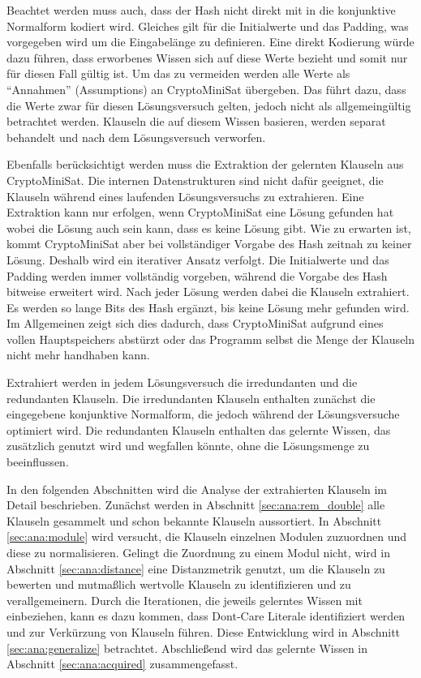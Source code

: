 Beachtet werden muss auch, dass der Hash nicht direkt mit in die konjunktive Normalform kodiert wird. Gleiches gilt für die Initialwerte
und das Padding, was vorgegeben wird um die Eingabelänge zu definieren. Eine direkt Kodierung würde dazu führen, dass erworbenes Wissen
sich auf diese Werte bezieht und somit nur für diesen Fall gültig ist. Um das zu vermeiden werden alle Werte als "`Annahmen"' (Assumptions)
an CryptoMiniSat übergeben. Das führt dazu, dass die Werte zwar für diesen Lösungsversuch gelten, jedoch nicht als allgemeingültig betrachtet
werden. Klauseln die auf diesem Wissen basieren, werden separat behandelt und nach dem Lösungsversuch verworfen.

Ebenfalls berücksichtigt werden muss die Extraktion der gelernten Klauseln aus CryptoMiniSat. Die internen Datenstrukturen sind nicht dafür
geeignet, die Klauseln während eines laufenden Lösungsversuchs zu extrahieren. Eine Extraktion kann nur erfolgen, wenn CryptoMiniSat eine
Lösung gefunden hat wobei die Lösung auch sein kann, dass es keine Lösung gibt. Wie zu erwarten ist, kommt CryptoMiniSat aber bei vollständiger
Vorgabe des Hash zeitnah zu keiner Lösung. Deshalb wird ein iterativer Ansatz verfolgt. Die Initialwerte und das Padding werden immer vollständig vorgeben,
während die Vorgabe des Hash bitweise erweitert wird. Nach jeder Lösung werden dabei die Klauseln extrahiert. Es werden so lange Bits des Hash
ergänzt, bis keine Lösung mehr gefunden wird. Im Allgemeinen zeigt sich dies dadurch, dass CryptoMiniSat aufgrund eines vollen Hauptspeichers
abstürzt oder das Programm selbst die Menge der Klauseln nicht mehr handhaben kann.

Extrahiert werden in jedem Lösungsversuch die irredundanten und die redundanten Klauseln. Die irredundanten Klauseln enthalten zunächst die
eingegebene konjunktive Normalform, die jedoch während der Lösungsversuche optimiert wird. Die redundanten Klauseln enthalten das gelernte
Wissen, das zusätzlich genutzt wird und wegfallen könnte, ohne die Lösungsmenge zu beeinflussen.

In den folgenden Abschnitten wird die Analyse der extrahierten Klauseln im Detail beschrieben. Zunächst werden in Abschnitt \ref{sec:ana:rem_double}
alle Klauseln gesammelt und schon bekannte Klauseln aussortiert. In Abschnitt \ref{sec:ana:module} wird versucht, die Klauseln einzelnen Modulen
zuzuordnen und diese zu normalisieren. Gelingt die Zuordnung zu einem Modul nicht, wird in Abschnitt \ref{sec:ana:distance} eine Distanzmetrik
genutzt, um die Klauseln zu bewerten und mutmaßlich wertvolle Klauseln zu identifizieren und zu verallgemeinern. Durch die Iterationen, die jeweils
gelerntes Wissen mit einbeziehen, kann es dazu kommen, dass Dont-Care Literale identifiziert werden und zur Verkürzung von Klauseln führen.
Diese Entwicklung wird in Abschnitt \ref{sec:ana:generalize} betrachtet. Abschließend wird das gelernte Wissen in Abschnitt \ref{sec:ana:acquired}
zusammengefasst. 






